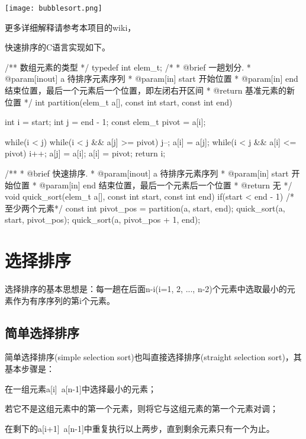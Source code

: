 \begin{center}
\texttt{[image: bubblesort.png]}\\
\label{fig:bubblesort}
\end{center}

更多详细解释请参考本项目的wiki，

快速排序的C语言实现如下。
\begin{Codex}[label=quick_sort.c]
/** 数组元素的类型 */
typedef int elem_t;
 /*
  * @brief 一趟划分.
  * @param[inout] a 待排序元素序列
  * @param[in] start 开始位置
  * @param[in] end 结束位置，最后一个元素后一个位置，即左闭右开区间
  * @return 基准元素的新位置
  */
int partition(elem_t a[], const int start, const int end) {
    int i = start;
    int j = end - 1;
    const elem_t pivot = a[i];

    while(i < j) {
        while(i < j && a[j] >= pivot) j--;
        a[i] = a[j];
        while(i < j && a[i] <= pivot) i++;
        a[j] = a[i];
    }
    a[i] = pivot;
    return i;
}

/**
  * @brief 快速排序.
  * @param[inout] a 待排序元素序列
  * @param[in] start 开始位置
  * @param[in] end 结束位置，最后一个元素后一个位置
  * @return 无
  */
void quick_sort(elem_t a[], const int start, const int end) {
    if(start < end - 1) { /* 至少两个元素*/
        const int pivot_pos = partition(a, start, end);
        quick_sort(a, start, pivot_pos);
        quick_sort(a, pivot_pos + 1, end);
    }
}
\end{Codex}


\section{选择排序} %
选择排序的基本思想是：每一趟在后面n-i(i=1, 2, ..., n-2)个元素中选取最小的元素作为有序序列的第i个元素。


\subsection{简单选择排序}
简单选择排序(simple selection sort)也叫直接选择排序(straight selection sort)，其基本步骤是：
\begindot
\item 在一组元素a[i]~a[n-1]中选择最小的元素；
\item 若它不是这组元素中的第一个元素，则将它与这组元素的第一个元素对调；
\item 在剩下的a[i+1]~a[n-1]中重复执行以上两步，直到剩余元素只有一个为止。
\myenddot

